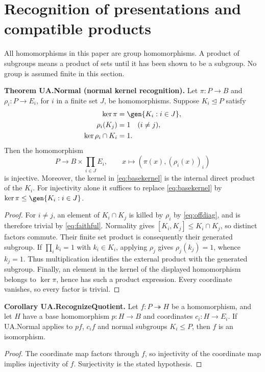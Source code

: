 \section{Recognition of presentations and compatible products}

All homomorphisms in this paper are group homomorphisms. A product of subgroups
means a product of sets until it has been shown to be a subgroup. No group is
assumed finite in this section.

\textbf{Theorem UA.Normal (normal kernel recognition).}
Let $\pi:P\to B$ and $\rho_i:P\to E_i$, for $i$ in a finite set $J$, be
homomorphisms. Suppose $K_i\unlhd P$ satisfy
\begin{align}
 \ker\pi&=\gen{K_i:i\in J},\label{eq:basekernel}\\
 \rho_i(K_j)&=1\quad(i\ne j),\label{eq:offdiag}\\
 \ker\rho_i\cap K_i&=1.\label{eq:faithful}
\end{align}
Then the homomorphism
\[
 P\longrightarrow B\times\prod_{i\in J}E_i,
 \qquad x\longmapsto (\pi(x),(\rho_i(x))_i)
\]
is injective. Moreover, the kernel in \eqref{eq:basekernel} is the internal
direct product of the $K_i$. For injectivity alone it suffices to replace
\eqref{eq:basekernel} by $\ker\pi\leq\gen{K_i:i\in J}$.

\begin{proof}
For $i\ne j$, an element of $K_i\cap K_j$ is killed by $\rho_i$ by
\eqref{eq:offdiag}, and is therefore trivial by \eqref{eq:faithful}.
Normality gives $[K_i,K_j]\leq K_i\cap K_j$, so distinct factors commute.
Their finite set product is consequently their generated subgroup. If
$\prod_i k_i=1$ with $k_i\in K_i$, applying $\rho_j$ gives
$\rho_j(k_j)=1$, whence $k_j=1$. Thus multiplication identifies the external
product with the generated subgroup. Finally, an element in the kernel of the
displayed homomorphism belongs to $\ker\pi$, hence has such a product
expression. Every coordinate vanishes, so every factor is trivial.
\end{proof}

\textbf{Corollary UA.RecognizeQuotient.}
Let $f:P\twoheadrightarrow H$ be a homomorphism, and let $H$ have a base
homomorphism $p:H\to B$ and coordinates $c_i:H\to E_i$. If
UA.Normal applies to $p f$, $c_i f$ and normal subgroups
$K_i\leq P$, then $f$ is an isomorphism.

\begin{proof}
The coordinate map factors through $f$, so injectivity of the coordinate map
implies injectivity of $f$. Surjectivity is the stated hypothesis.
\end{proof}

